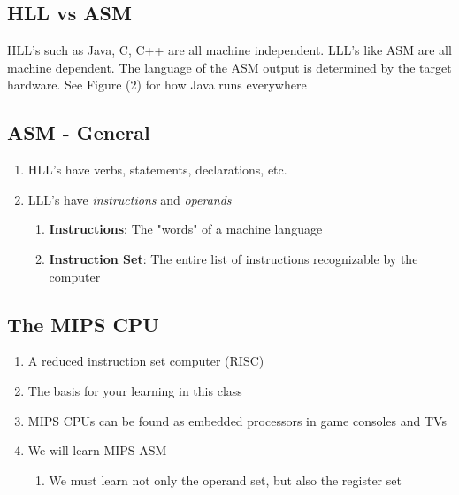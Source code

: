 \documentclass[12pt]{article}
\begin{document}
\subsection{HLL vs ASM}
HLL's such as Java, C, C++ are all machine independent. LLL's like ASM are all machine dependent. The language of the ASM output is determined by the target hardware. See Figure (2) for how Java runs everywhere



\subsection{ASM - General}
\begin{enumerate}
  \item HLL's have verbs, statements, declarations, etc.
  \item LLL's have \textit{instructions} and \textit{operands}
  \begin{enumerate}
    \item[] \textbf{Instructions}: The "words" of a machine language
    \item[] \textbf{Instruction Set}: The entire list of instructions recognizable by the computer
  \end{enumerate}
\end{enumerate}



\subsection{The MIPS CPU}
\begin{enumerate}
  \item A reduced instruction set computer (RISC)
  \item The basis for your learning in this class
  \item MIPS CPUs can be found as embedded processors in game consoles and TVs
  \item We will learn MIPS ASM
  \begin{enumerate}
    \item We must learn not only the operand set, but also the register set
  \end{enumerate}
\end{enumerate}
\end{document}
